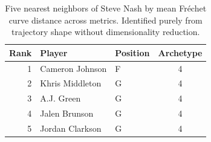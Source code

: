 \begin{table}[htbp]
  \centering\small
  \begin{tabular}{rllc}
    \toprule
    Rank & Player & Position & Archetype \\
    \midrule
    1 & Cameron Johnson & F & 4 \\
    2 & Khris Middleton & G & 4 \\
    3 & A.J. Green & G & 4 \\
    4 & Jalen Brunson & G & 4 \\
    5 & Jordan Clarkson & G & 4 \\
    \bottomrule
  \end{tabular}
  \caption{Five nearest neighbors of Steve Nash by mean Fr\'{e}chet curve distance across metrics. Identified purely from trajectory shape without dimensionality reduction.}
  \label{tab:Steve_Nash_frechet_curve_neighbors}
\end{table}

